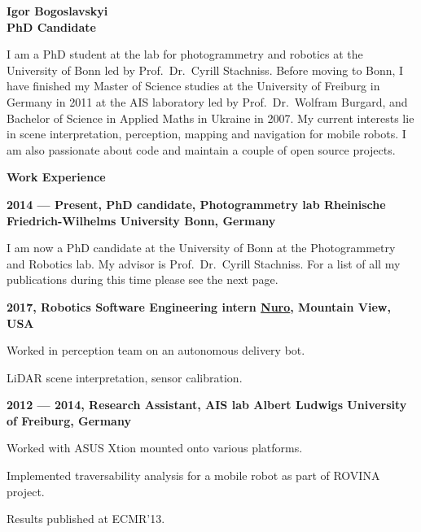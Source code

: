 \documentclass[a4paper,12pt,final]{memoir}
\newcommand{\Sep}{\vspace{1.5em}}
\newcommand{\SmallSep}{\vspace{0.5em}}
\newenvironment{AboutMe}
	{\ignorespaces}
	{\Sep\ignorespacesafterend}
\newcommand{\CVSection}[1]
	{\Large\textbf{#1}\par
	\SmallSep\normalsize\normalfont}
\newcommand{\CVItem}[1]
	{\textbf{\color{MidnightBlue} #1}}
\begin{document}
\framebreak{}


\Huge\bfseries {\color{MidnightBlue} Igor Bogoslavskyi} \\
\Large\bfseries  PhD Candidate \\

\normalsize\normalfont{}

\begin{AboutMe}
I am a PhD student at the lab for photogrammetry and robotics at the University
of Bonn led by Prof.~Dr.~Cyrill Stachniss. Before moving to Bonn, I have
finished my Master of Science studies at the University of Freiburg in Germany
in 2011 at the AIS laboratory led by Prof.~Dr.~Wolfram Burgard, and Bachelor of
Science in Applied Maths in Ukraine in 2007. My current interests lie in scene
interpretation, perception, mapping and navigation for mobile robots. I am also
passionate about code and maintain a couple of open source projects.
\end{AboutMe}

\CVSection{Work Experience}
\CVItem{2014 --- Present, PhD candidate, Photogrammetry lab
\newline Rheinische Friedrich-Wilhelms University Bonn, Germany}
\begin{compactitem}[\color{RoyalBlue}$\circ$]
\item I am now a PhD candidate at the University of Bonn at the Photogrammetry
and Robotics lab. My advisor is Prof.~Dr.~Cyrill Stachniss. For a list of
all my publications during this time please see the next page.
\end{compactitem}
\SmallSep

\CVItem{2017, Robotics Software Engineering intern
\newline \href{https://nuro.ai/}{Nuro}, Mountain View, USA}
\begin{compactitem}[\color{MidnightBlue}$\circ$]
\item Worked in perception team on an autonomous delivery bot.
\item LiDAR scene interpretation, sensor calibration.
\end{compactitem}

\CVItem{2012 --- 2014, Research Assistant, AIS lab
\newline Albert Ludwigs University of Freiburg, Germany}
\begin{compactitem}[\color{RoyalBlue}$\circ$]
\item Worked with ASUS Xtion mounted onto various platforms.
\item Implemented traversability analysis for a mobile robot as part of ROVINA
project.
\item Results published at ECMR'13.
\end{compactitem}
\SmallSep
\end{document}
